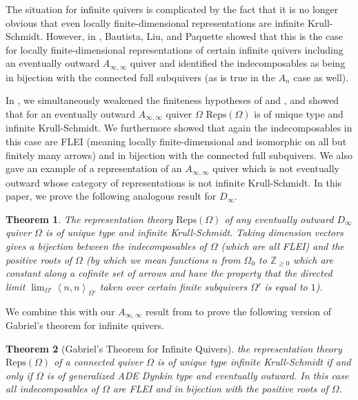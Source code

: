 \documentclass{article}
\newcommand{\bracket}[1]{\left \langle #1 \right\rangle}
\newtheorem{lettertheorem}{Theorem}
\begin{document}
The situation for infinite quivers is complicated by the fact that it is no longer obvious that even locally finite-dimensional representations are infinite Krull-Schmidt. However, in \cite{bautista-liu-paquette2011}, Bautista, Liu, and Paquette showed that this is the case for locally finite-dimensional representations of certain infinite quivers including an eventually outward $A_{\infty, \infty}$ quiver and identified the indecomposables as being in bijection with the connected full subquivers (as is true in the $A_n$ case as well). 

In \cite{gallup2022decompositions}, we simultaneously weakened the finiteness hypotheses of \cite{ringel2016} and \cite{bautista-liu-paquette2011}, and showed that  for an eventually outward $A_{\infty, \infty}$ quiver $\Omega$ $\text{Reps}(\Omega)$ is of unique type and  infinite Krull-Schmidt. We furthermore showed that again the indecomposables in this case are FLEI (meaning locally finite-dimensional and isomorphic on all but finitely many arrows) and in bijection with the connected full subquivers. We also gave an example of a representation of an $A_{\infty, \infty}$ quiver which is not eventually outward whose category of representations is not infinite Krull-Schmidt. In this paper, we prove the following analogous result for $D_\infty$. 

\begin{lettertheorem}
The representation theory $\text{Reps}(\Omega)$ of any eventually outward $D_\infty$ quiver $\Omega$ is of unique type and infinite Krull-Schmidt. Taking dimension vectors gives a bijection between the indecomposables of $\Omega$ (which are all FLEI) and the positive roots of $\Omega$ (by which we mean functions $n$ from $\Omega_0$ to $\mathbb{Z}_{\geq 0}$ which are constant along a cofinite set of arrows and have the property that the directed limit $\lim_{\Omega'} \bracket{n , n}_{\Omega'}$ taken over certain finite subquivers $\Omega'$ is equal to $1$). 
\end{lettertheorem}

We combine this with our $A_{\infty , \infty}$ result from \cite{gallup2022decompositions} to prove the following version of Gabriel's theorem for infinite quivers. 

\begin{lettertheorem}[Gabriel's Theorem for Infinite Quivers]\label{thm: gab intro}
the representation theory $\text{Reps}(\Omega)$ of a connected quiver $\Omega$ is of unique type infinite Krull-Schmidt if and only if $\Omega$ is of generalized ADE Dynkin type and eventually outward. In this case all indecomposables of $\Omega$ are FLEI and in bijection with the positive roots of $\Omega$.  
\end{lettertheorem}
\end{document}
